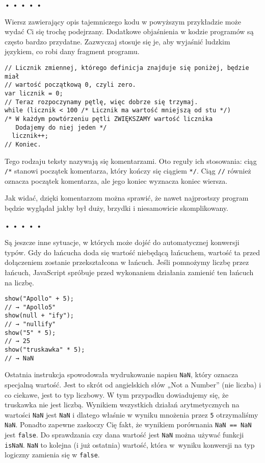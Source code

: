   
\begin{center}
• • • • •
\end{center}
  
    
Wiersz zawierający opis tajemniczego kodu w powyższym przykładzie może wydać Ci się trochę podejrzany. Dodatkowe objaśnienia w kodzie programów są często bardzo przydatne. Zazwyczaj stosuje się je, aby wyjaśnić ludzkim językiem, co robi dany fragment programu.

\begin{verbatim} 
// Licznik zmiennej, którego definicja znajduje się poniżej, będzie miał
// wartość początkową 0, czyli zero.
var licznik = 0;
// Teraz rozpoczynamy pętlę, więc dobrze się trzymaj.
while (licznik < 100 /* Licznik ma wartość mniejszą od stu */)
/* W każdym powtórzeniu pętli ZWIĘKSZAMY wartość licznika
   Dodajemy do niej jeden */
  licznik++;
// Koniec.
\end{verbatim}
    
Tego rodzaju teksty nazywają się komentarzami. Oto reguły ich stosowania: ciąg \texttt{/*} stanowi początek komentarza, który kończy się ciągiem \texttt{*/}. Ciąg \texttt{//} również oznacza początek komentarza, ale jego koniec wyznacza koniec wiersza.

    
Jak widać, dzięki komentarzom można sprawić, że nawet najprostszy program będzie wyglądał jakby był duży, brzydki i niesamowicie skomplikowany.

  
\begin{center}
• • • • •
\end{center}
  
    
Są jeszcze inne sytuacje, w których może dojść do automatycznej konwersji typów. Gdy do łańcucha doda się wartość niebędącą łańcuchem, wartość ta przed dołączeniem zostanie przekształcona w łańcuch. Jeśli pomnożymy liczbę przez łańcuch, JavaScript spróbuje przed wykonaniem działania zamienić ten łańcuch na liczbę.

\begin{verbatim} 
show("Apollo" + 5);
// → "Apollo5"
show(null + "ify");
// → "nullify"
show("5" * 5);
// → 25
show("truskawka" * 5);
// → NaN
\end{verbatim}
    
Ostatnia instrukcja spowodowała wydrukowanie napisu \texttt{NaN}, który oznacza specjalną wartość. Jest to skrót od angielskich słów „Not a Number” (nie liczba) i co ciekawe, jest to typ liczbowy. W tym przypadku dowiadujemy się, że truskawka nie jest liczbą. Wynikiem wszystkich działań arytmetycznych na wartości \texttt{NaN} jest \texttt{NaN} i dlatego właśnie w wyniku mnożenia przez \texttt{5} otrzymaliśmy \texttt{NaN}. Ponadto zapewne zaskoczy Cię fakt, że wynikiem porównania \texttt{NaN == NaN} jest \texttt{false}. Do sprawdzania czy dana wartość jest \texttt{NaN} można używać funkcji \texttt{isNaN}. \texttt{NaN} to kolejna (i już ostatnia) wartość, która w~wyniku konwersji na typ logiczny zamienia się w \texttt{false}.

